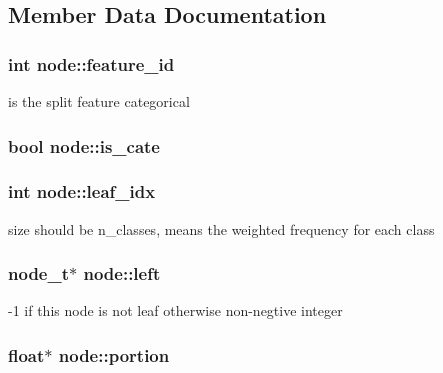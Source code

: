 \subsection{Member Data Documentation}
\hypertarget{classnode_ad65aefa2c967c82cd88e6870085d7f3e}{
\subsubsection[{feature\+\_\+id}]{\setlength{\rightskip}{0pt plus 5cm}int node\+::feature\+\_\+id\hspace{0.3cm}{\ttfamily [protected]}}}\label{classnode_ad65aefa2c967c82cd88e6870085d7f3e}
is the split feature categorical \hypertarget{classnode_a67c3c0be5001ace8494a6292e8079001}{
\subsubsection[{is\+\_\+cate}]{\setlength{\rightskip}{0pt plus 5cm}bool node\+::is\+\_\+cate\hspace{0.3cm}{\ttfamily [protected]}}}\label{classnode_a67c3c0be5001ace8494a6292e8079001}
\hypertarget{classnode_abbd7d4174869fead5f901b042a2f9712}{
\subsubsection[{leaf\+\_\+idx}]{\setlength{\rightskip}{0pt plus 5cm}int node\+::leaf\+\_\+idx\hspace{0.3cm}{\ttfamily [protected]}}}\label{classnode_abbd7d4174869fead5f901b042a2f9712}
size should be n\+\_\+classes, means the weighted frequency for each class \hypertarget{classnode_aacd557e63e1f9dca9048ed58bb3dbb2c}{
\subsubsection[{left}]{\setlength{\rightskip}{0pt plus 5cm}node\+\_\+t$\ast$ node\+::left\hspace{0.3cm}{\ttfamily [protected]}}}\label{classnode_aacd557e63e1f9dca9048ed58bb3dbb2c}
-\/1 if this node is not leaf otherwise non-\/negtive integer \hypertarget{classnode_a4c6e2c13d2313c35199252051bd46c46}{
\subsubsection[{portion}]{\setlength{\rightskip}{0pt plus 5cm}float$\ast$ node\+::portion\hspace{0.3cm}{\ttfamily [protected]}}}\label{classnode_a4c6e2c13d2313c35199252051bd46c46}
